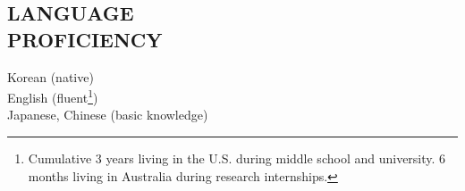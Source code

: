 \documentclass[margin, 10pt]{res} %
\begin{document}
\begin{resume}
\section{LANGUAGE \\ PROFICIENCY} 

Korean (native) \\
English (fluent\footnote{Cumulative 3 years living in the U.S. during middle school and university. 6 months living in Australia during research internships.}) \\
Japanese, Chinese (basic knowledge) \\
 




\end{resume}
\end{document}
